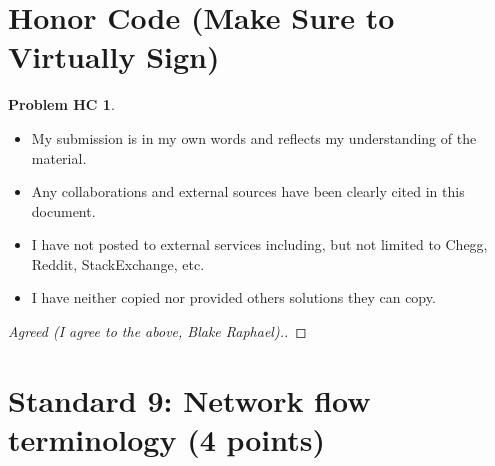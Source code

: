 \documentclass[11pt]{article}
\theoremstyle{definition}
\theoremstyle{definition}
\newtheorem*{requiredHC}{Problem HC}
\theoremstyle{definition}
\begin{document}
\newpage
\section*{Honor Code (Make Sure to Virtually Sign)} \label{HonorCode}
\hypertarget{HonorCode}{}

\begin{requiredHC}
\begin{itemize}
\item My submission is in my own words and reflects my understanding of the material.
\item Any collaborations and external sources have been clearly cited in this document.
\item I have not posted to external services including, but not limited to Chegg, Reddit, StackExchange, etc.
\item I have neither copied nor provided others solutions they can copy.
\end{itemize}

\end{requiredHC}

\begin{proof}[Agreed (I agree to the above, Blake Raphael).]
\end{proof}


\newpage
\setcounter{section}{8}
\section{Standard 9: Network flow terminology (4 points)}
\end{document}
